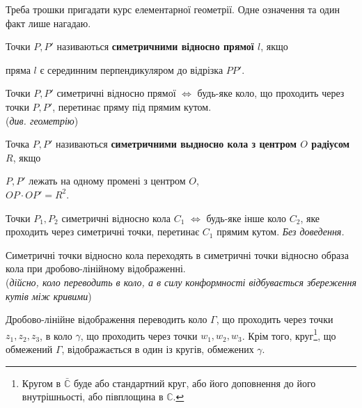 \documentclass{math_library}
\begin{document}
Треба трошки пригадати курс елементарної геометрії. Одне означення та один факт лише нагадаю.

\begin{definition}
Точки $P,P'$ називаються \textbf{симетричними відносно прямої $l$}, якщо
\begin{center}
пряма $l$ є серединним перпендикуляром до відрізка $PP'$.
\end{center}
\end{definition}

\begin{proposition}
Точки $P,P'$ симетричні відносно прямої $\iff$ будь-яке коло, що проходить через точки $P,P'$, перетинає пряму під прямим кутом.\\
(\textit{див. геометрію})
\end{proposition}

\begin{definition}
Точка $P,P'$ називаються \textbf{симетричними выдносно кола з центром $O$ радіусом $R$}, якщо
\begin{center}
$P,P'$ лежать на одному промені з центром $O$, \\
$OP \cdot OP' = R^2$.
\end{center}
\begin{figure}[H]
\centering
{}
\end{figure}
\end{definition}

\begin{proposition}
Точки $P_1,P_2$ симетричні відносно кола $C_1$ $\iff$ будь-яке інше коло $C_2$, яке проходить через симетричні точки, перетинає $C_1$ прямим кутом.
\textit{Без доведення.}
\end{proposition}

\begin{corollary}
Симетричні точки відносно кола переходять в симетричні точки відносно образа кола при дробово-лінійному відображенні.\\
(\textit{дійсно, коло переводить в коло, а в силу конформності відбувається збереження кутів між кривими})
\end{corollary}

\begin{corollary}
Дробово-лінійне відображення переводить коло $\Gamma$, що проходить через точки $z_1,z_2,z_3$, в коло $\gamma$, що проходить через точки $w_1,w_2,w_3$. Крім того, круг\footnote{Кругом в $\bar{\mathbb{C}}$ буде або стандартний круг, або його доповнення до його внутрішньості, або півплощина в $\mathbb{C}$.}, що обмежений $\Gamma$, відображається в один із кругів, обмежених $\gamma$.
\end{corollary}
\end{document}
